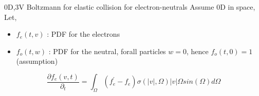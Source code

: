 \begin{frame}{0D,3V Boltzmann for elastic collision for electron-neutrals}
    Assume 0D in space, Let, 
    \begin{itemize}
        \item $f_e(t,v)$ : PDF for the electrons
        \item $f_o(t,w)$ : PDF for the neutral, forall particles $w=0$, hence $f_o(t,0) = 1$ (assumption)
    \end{itemize}
    \begin{equation}
        \frac{\partial f_e(v,t)}{\partial_t} = \int_{\Omega} (f_e^\prime -f_e) \sigma(|v|,\Omega) |v| \Omega sin(\Omega) d\Omega
    \end{equation}
\end{frame}